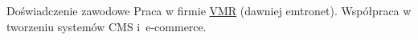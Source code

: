 \begin{rubric}{Doświadczenie zawodowe}
Praca w firmie \href{http://vmr.pl/}{VMR} (dawniej emtronet).
Współpraca w tworzeniu systemów CMS i~\hbox{e-commerce}.
\end{rubric}

